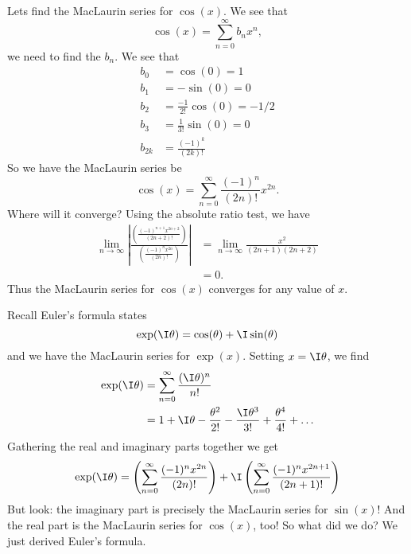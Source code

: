 \begin{example}

Lets find the MacLaurin series for $\cos(x)$. We see that
\begin{equation}
\cos(x)=\sum^{\infty}_{n=0}b_{n}x^{n},
\end{equation}
we need to find the $b_{n}$. We see that
\begin{equation}
\begin{aligned}
b_{0} &= \cos(0) = 1\\
b_{1} &= -\sin(0) = 0\\
b_{2} &= \frac{-1}{2!}\cos(0) = -1/2\\
b_{3} &= \frac{1}{3!}\sin(0) = 0\\
b_{2k} &= \frac{(-1)^{k}}{(2k)!}
\end{aligned}
\end{equation}
So we have the MacLaurin series be
\begin{equation}
\cos(x) = \sum^{\infty}_{n=0}\frac{(-1)^{n}}{(2n)!}x^{2n}.
\end{equation}
Where will it converge? Using the absolute ratio test, we have
\begin{equation}
\begin{aligned}
\lim_{n\to\infty}\left|\frac{\left(\displaystyle\frac{(-1)^{n+1}x^{2n+2}}{(2n+2)!}\right)}{\left(\displaystyle\frac{(-1)^{n}x^{2n}}{(2n)!}\right)}\right|
&=\lim_{n\to\infty}\frac{x^{2}}{(2n+1)(2n+2)}\\
&=0.
\end{aligned}
\end{equation}
Thus the MacLaurin series for $\cos(x)$ converges for any value
of $x$.
\end{example}



Recall Euler's formula states
\begin{equation}
\exp(\I\theta)=\cos(\theta)+\I\sin(\theta)
\end{equation}
and we have the MacLaurin  series for $\exp(x)$. Setting
$x=\I\theta$, we find
\begin{equation}
\begin{aligned}
\exp(\I\theta) &= \sum^{\infty}_{n=0}\frac{(\I\theta)^{n}}{n!}\\
&=1+\I\theta-\frac{\theta^{2}}{2!}-\frac{\I\theta^{3}}{3!}+\frac{\theta^{4}}{4!}+\dots
\end{aligned}
\end{equation}
Gathering the real and imaginary parts together we get
\begin{equation}\label{eq:taylorSeries:expITheta:comparison}
\exp(\I\theta) =
\left(\sum^{\infty}_{n=0}\frac{(-1)^{n}x^{2n}}{(2n)!}\right)
+\I\left(\sum^{\infty}_{n=0}\frac{(-1)^{n}x^{2n+1}}{(2n+1)!}\right)
\end{equation}
But look: the imaginary part is precisely the MacLaurin series
for $\sin(x)$! And the real part is the MacLaurin series for
$\cos(x)$, too! So what did we do? We just derived Euler's
formula. 

